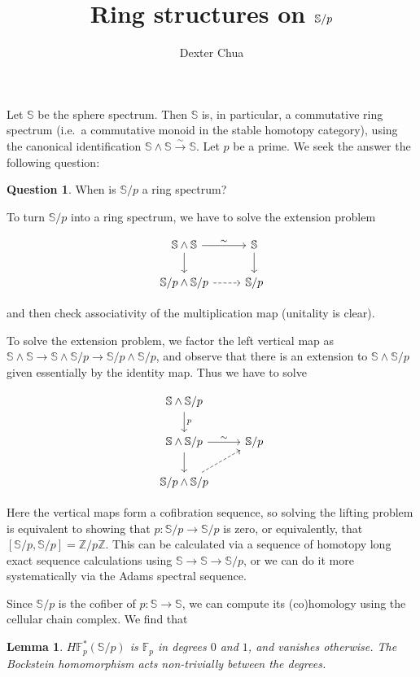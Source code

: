 \documentclass{shortart}
\title{Ring structures on \texorpdfstring{$\Sph/p$}{S/p}}
\author{Dexter Chua}
\newtheorem*{lemma}{Lemma}
\theoremstyle{definition}
\newtheorem*{ques}{Question}
\newcommand\Sph{\mathbb{S}}
\newcommand\F{\mathbb{F}}
\newcommand\Z{\mathbb{Z}}
\begin{document}
Let $\Sph$ be the sphere spectrum. Then $\Sph$ is, in particular, a commutative ring spectrum (i.e.\ a commutative monoid in the stable homotopy category), using the canonical identification $\Sph \wedge \Sph \overset{\sim}{\to} \Sph$. Let $p$ be a prime. We seek the answer the following question:
\begin{ques}
  When is $\Sph/p$ a ring spectrum?
\end{ques}

To turn $\Sph/p$ into a ring spectrum, we have to solve the extension problem
\begin{useimager}
\[
  \begin{tikzcd}
    \Sph \wedge \Sph \ar[r, "\sim"] \ar[d] & \Sph \ar[d]\\
    \Sph/p \wedge \Sph/p \ar[r, dashed] & \Sph/p
  \end{tikzcd}
\]
\end{useimager}
and then check associativity of the multiplication map (unitality is clear).

To solve the extension problem, we factor the left vertical map as $\Sph \wedge \Sph \to \Sph \wedge \Sph/p \to \Sph/p \wedge \Sph/p$, and observe that there is an extension to $\Sph \wedge \Sph/p$ given essentially by the identity map. Thus we have to solve
\begin{useimager}
\[
  \begin{tikzcd}
    \Sph \wedge \Sph/p \ar[d, "p"] \\
    \Sph \wedge \Sph/p \ar[r, "\sim"] \ar[d] & \Sph/p\\
    \Sph/p \wedge \Sph/p \ar[ur, dashed]
  \end{tikzcd}
\]
\end{useimager}
Here the vertical maps form a cofibration sequence, so solving the lifting problem is equivalent to showing that $p: \Sph/p \to \Sph/p$ is zero, or equivalently, that $[\Sph/p, \Sph/p] = \Z/p\Z$. This can be calculated via a sequence of homotopy long exact sequence calculations using $\Sph \to \Sph \to \Sph/p$, or we can do it more systematically via the Adams spectral sequence.

Since $\Sph/p$ is the cofiber of $p: \Sph \to \Sph$, we can compute its (co)homology using the cellular chain complex. We find that
\begin{lemma}
  $H\F_p^*(\Sph/p)$ is $\F_p$ in degrees $0$ and $1$, and vanishes otherwise. The Bockstein homomorphism acts non-trivially between the degrees.\fakeqed
\end{lemma}
\end{document}
